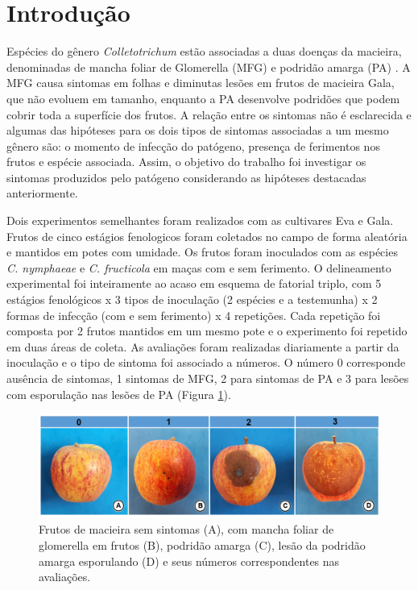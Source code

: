 \documentclass[a4paper,]{book}
\begin{document}
\section{Introdução}\label{introducao}

Espécies do gênero \emph{Colletotrichum} estão associadas a duas doenças
da macieira, denominadas de mancha foliar de Glomerella (MFG) e podridão
amarga (PA) \citep{Damm2012, Gonzlez2006}. A MFG causa sintomas em
folhas e diminutas lesões em frutos de macieira Gala, que não evoluem em
tamanho, enquanto a PA desenvolve podridões que podem cobrir toda a
superfície dos frutos. A relação entre os sintomas não é esclarecida
\citep{Kat2000} e algumas das hipóteses para os dois tipos de sintomas
associadas a um mesmo gênero são: o momento de infecção do patógeno,
presença de ferimentos nos frutos e espécie associada. Assim, o objetivo
do trabalho foi investigar os sintomas produzidos pelo patógeno
considerando as hipóteses destacadas anteriormente.

Dois experimentos semelhantes foram realizados com as cultivares Eva e
Gala. Frutos de cinco estágios fenologicos foram coletados no campo de
forma aleatória e mantidos em potes com umidade. Os frutos foram
inoculados com as espécies \emph{C. nymphaeae} e \emph{C. fructicola} em
maças com e sem ferimento. O delineamento experimental foi inteiramente
ao acaso em esquema de fatorial triplo, com 5 estágios fenológicos x 3
tipos de inoculação (2 espécies e a testemunha) x 2 formas de infecção
(com e sem ferimento) x 4 repetições. Cada repetição foi composta por 2
frutos mantidos em um mesmo pote e o experimento foi repetido em duas
áreas de coleta. As avaliações foram realizadas diariamente a partir da
inoculação e o tipo de sintoma foi associado a números. O número 0
corresponde ausência de sintomas, 1 sintomas de MFG, 2 para sintomas de
PA e 3 para lesões com esporulação nas lesões de PA (Figura
\ref{fig:sintomas}).





\begin{figure}

{\centering \includegraphics[width=1\linewidth]{./camilla/sintomas} 

}

\caption{Frutos de macieira sem sintomas (A), com mancha foliar de
glomerella em frutos (B), podridão amarga (C), lesão da podridão amarga
esporulando (D) e seus números correspondentes nas avaliações.}\label{fig:sintomas}
\end{figure}
\end{document}
